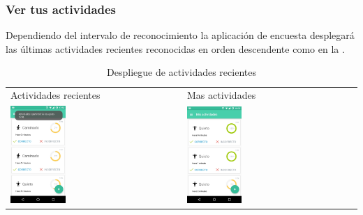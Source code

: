 {\subsubsection{Ver tus actividades}
\label{contrib:ver-tus-actividades}
Dependiendo del intervalo de reconocimiento la aplicación de encuesta desplegará las últimas actividades recientes
reconocidas en orden descendente como en la .

\begin{table}[!h]
\begin{tabular}{ll}
\textsf{\relax 
Actividades recientes
} & \textsf{\relax 
Mas actividades
}\\
    {\includegraphics[width=0.33\textwidth]{anexos/graphics/activities_toast.jpg}}
 & 
    {\includegraphics[width=0.33\textwidth]{anexos/graphics/activities.jpg}}
\\
\end{tabular}
    \caption{Despliegue de actividades recientes}\label{contrib:actrec}
\end{table}

}
